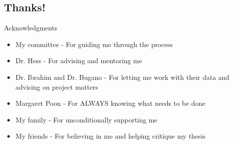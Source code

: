 \subsection{Thanks!}
\begin{frame}{Acknowledgments}
 \begin{itemize}
  \item My committee - For guiding me through the process
  \item Dr. Hess - For advising and mentoring me
  \item Dr. Ibrahim and Dr. Bugano - For letting me work with their data and advising
  on project matters
  \item Margaret Poon - For ALWAYS knowing what needs to be done
  \item My family - For unconditionally supporting me
  \item My friends - For believing in me and helping critique my thesis
  
 \end{itemize}

\end{frame}

